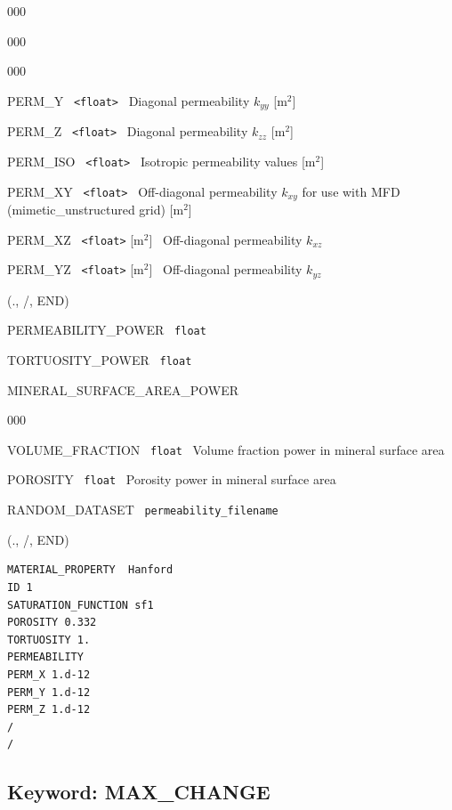 \documentclass[12pt]{article}
\begin{document}
\begin{deflist}{000}
\begin{deflist}{000}
\begin{deflist}{000}
\item[PERM\_Y] \ {\tt <float>} \ Diagonal permeability $k_{yy}$ [m$^2$]
\item[PERM\_Z] \ {\tt <float>} \ Diagonal permeability $k_{zz}$ [m$^2$]
\item[PERM\_ISO] \ {\tt <float>} \ Isotropic permeability values [m$^2$]
\item[PERM\_XY] \ {\tt <float>} \ Off-diagonal permeability $k_{xy}$ for use with MFD (mimetic\_unstructured grid) [m$^2$]
\item[PERM\_XZ] \ {\tt <float>} [m$^2$] \ Off-diagonal permeability $k_{xz}$
\item[PERM\_YZ] \ {\tt <float>} [m$^2$] \ Off-diagonal permeability $k_{yz}$
\end{deflist}
\item[(., /, END)]
\item[PERMEABILITY\_POWER] \ {\tt float}
\item[TORTUOSITY\_POWER] \ {\tt float}
\item[MINERAL\_SURFACE\_AREA\_POWER] ~
\begin{deflist}{000}
\item[VOLUME\_FRACTION] \ {\tt float} \ Volume fraction power in mineral surface area
\item[POROSITY] \ {\tt float} \ Porosity power in mineral surface area
\end{deflist}
\item[RANDOM\_DATASET] \ {\tt permeability\_filename}
\end{deflist}
\item[(., /, END)]
\end{deflist}


\begin{verbatim}
MATERIAL_PROPERTY  Hanford
ID 1
SATURATION_FUNCTION sf1
POROSITY 0.332
TORTUOSITY 1.
PERMEABILITY
PERM_X 1.d-12
PERM_Y 1.d-12
PERM_Z 1.d-12
/
/
\end{verbatim}


\newpage
\protect\hypertarget{target_max}{}

\subsection{Keyword: MAX\_CHANGE}
\end{document}
